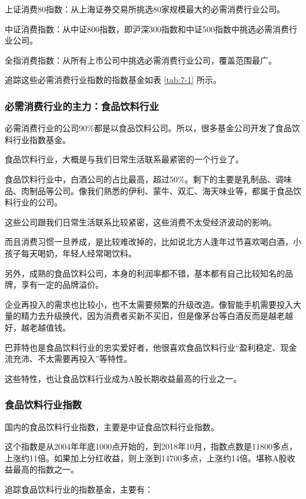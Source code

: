 上证消费80指数：从上海证券交易所挑选80家规模最大的必需消费行业公司。

中证消费指数：从中证800指数，即沪深300指数和中证500指数中挑选必需消费行业公司。

全指消费指数：从所有上市公司中挑选必需消费行业公司，覆盖范围最广。

追踪这些必需消费行业指数的指数基金如表 \ref{tab:7-1} 所示。



\subsubsection{必需消费行业的主力：食品饮料行业}

必需消费行业的公司90\%都是以食品饮料公司。所以，很多基金公司开发了食品饮料行业指数基金。

食品饮料行业，大概是与我们日常生活联系最紧密的一个行业了。

食品饮料行业中，白酒公司的占比最高，超过50\%。剩下的主要是乳制品、调味品、肉制品等公司。像我们熟悉的伊利、蒙牛、双汇、海天味业等，都属于食品饮料行业的公司。

这些公司跟我们日常生活联系比较紧密，这些消费不太受经济波动的影响。

而且消费习惯一旦养成，是比较难改掉的，比如说北方人逢年过节喜欢喝白酒，小孩子每天喝奶，年轻人经常喝饮料。

另外，成熟的食品饮料公司，本身的利润率都不错，基本都有自己比较知名的品牌，享有一定的品牌溢价。

企业再投入的需求也比较小，也不太需要频繁的升级改造。像智能手机需要投入大量的精力去升级换代，因为消费者买新不买旧，但是像茅台等白酒反而是越老越好，越老越值钱。

巴菲特也是食品饮料行业的忠实爱好者，他很喜欢食品饮料行业“盈利稳定、现金流充沛、不太需要再投入”等特性。

这些特性，也让食品饮料行业成为A股长期收益最高的行业之一。

\subsubsection{食品饮料行业指数}

国内的食品饮料行业指数，主要是中证食品饮料行业指数。

这个指数是从2004年年底1000点开始的，到2018年10月，指数点数是11800多点，上涨约11倍。如果加上分红收益，则上涨到14700多点，上涨约14倍。堪称A股收益最高的指数之一。

追踪食品饮料行业的指数基金，主要有：

